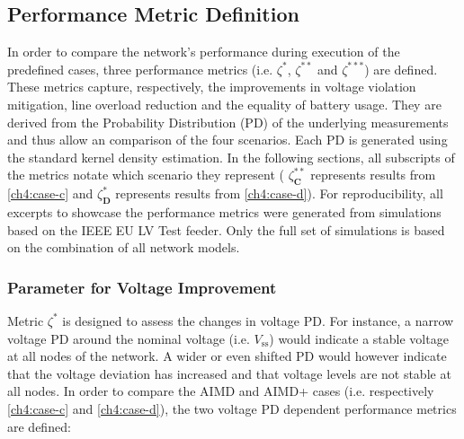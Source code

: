 \subsection{Performance Metric Definition}
\label{ch4:subsec:performance-metric-definition}

In order to compare the network's performance during execution of the predefined cases, three performance metrics (i.e. $\zeta^{*}$, $\zeta^{**}$ and $\zeta^{***}$) are defined.
These metrics capture, respectively, the improvements in voltage violation mitigation, line overload reduction and the equality of battery usage.
They are derived from the Probability Distribution (PD) of the underlying measurements and thus allow an comparison of the four scenarios.
Each PD is generated using the standard kernel density estimation.
In the following sections, all subscripts of the metrics notate which scenario they represent ( $\zeta_\textbf{C}^{**}$ represents results from \ref{ch4:case-c} and $\zeta_\textbf{D}^{*}$ represents results from \ref{ch4:case-d}).
For reproducibility, all excerpts to showcase the performance metrics were generated from simulations based on the IEEE EU LV Test feeder.
Only the full set of simulations is based on the combination of all network models.

\subsubsection{Parameter for Voltage Improvement}

Metric $\zeta^{*}$ is designed to assess the changes in voltage PD.
For instance, a narrow voltage PD around the nominal voltage (i.e. $V_\text{ss}$) would indicate a stable voltage at all nodes of the network.
A wider or even shifted PD would however indicate that the voltage deviation has increased and that voltage levels are not stable at all nodes.
In order to compare the AIMD and AIMD+ cases (i.e. respectively \ref{ch4:case-c} and \ref{ch4:case-d}), the two voltage PD dependent performance metrics are defined:


